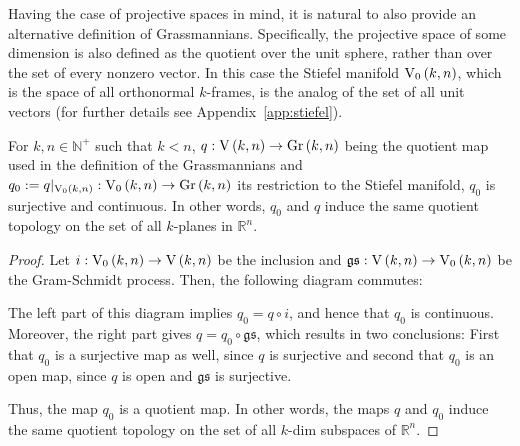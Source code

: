 Having the case of projective spaces in mind, it is natural to also provide an alternative definition of Grassmannians.
Specifically, the projective space of some dimension is also defined as the quotient over the unit sphere, rather than over the set of every nonzero vector.
In this case the Stiefel manifold $\StO{k}{n}$, which is the space of all orthonormal $k$-frames, is the analog of the set of all unit vectors (for further details see Appendix~\ref{app:stiefel}).

\begin{proposition} For $k,n\in\mathbb N^+$ such that $k<n$, $q:\St{k}{n}\to\Gr{k}{n}$ being the quotient map used in the definition of the Grassmannians and  $q_0:=q|_{\StO{k}{n}}:\StO{k}{n}\to\Gr{k}{n}$ its restriction to the Stiefel manifold, $q_0$ is surjective and continuous. In other words, $q_0$ and $q$ induce the same quotient topology on the set of all $k$-planes in $\mathbb{R}^n$.
\end{proposition}
\begin{proof}
Let $i:\StO{k}{n}\to\St{k}{n}$ be the inclusion and $\mathfrak{gs}:\St{k}{n}\to\StO{k}{n}$ be the Gram-Schmidt process. Then, the following diagram commutes:
\begin{center}
\end{center}
The left part of this diagram implies $q_0=q\circ i$, and hence that $q_0$ is continuous. Moreover, the right part gives $q=q_0\circ\mathfrak{gs}$, which results in two conclusions: First that $q_0$ is a surjective map as well, since $q$ is surjective and second that $q_0$ is an open map, since $q$ is open and $\mathfrak{gs}$ is surjective.

Thus, the map $q_0$ is a quotient map. In other words, the maps $q$ and $q_0$ induce the same quotient topology on the set of all $k$-dim subspaces of $\mathbb{R}^n$.
\end{proof}

